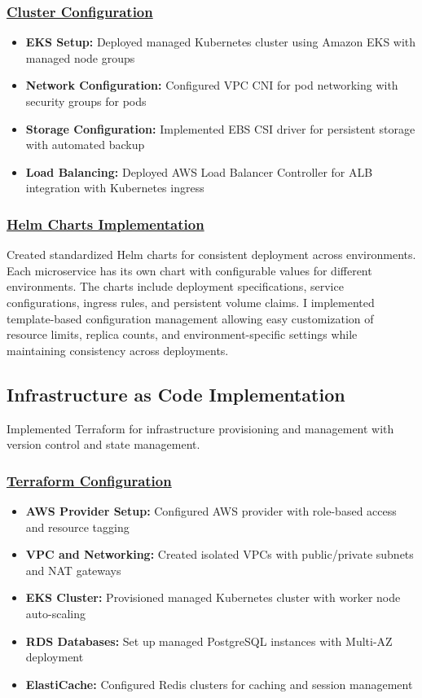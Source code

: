 \subsubsection*{\underline{Cluster Configuration}}
\begin{itemize}
    \item \textbf{EKS Setup:} Deployed managed Kubernetes cluster using Amazon EKS with managed node groups
    \item \textbf{Network Configuration:} Configured VPC CNI for pod networking with security groups for pods
    \item \textbf{Storage Configuration:} Implemented EBS CSI driver for persistent storage with automated backup
    \item \textbf{Load Balancing:} Deployed AWS Load Balancer Controller for ALB integration with Kubernetes ingress
\end{itemize}

\subsubsection*{\underline{Helm Charts Implementation}}
Created standardized Helm charts for consistent deployment across environments. Each microservice has its own chart with configurable values for different environments. The charts include deployment specifications, service configurations, ingress rules, and persistent volume claims. I implemented template-based configuration management allowing easy customization of resource limits, replica counts, and environment-specific settings while maintaining consistency across deployments.

\subsection{Infrastructure as Code Implementation}
Implemented Terraform for infrastructure provisioning and management with version control and state management.

\subsubsection*{\underline{Terraform Configuration}}
\begin{itemize}
    \item \textbf{AWS Provider Setup:} Configured AWS provider with role-based access and resource tagging
    \item \textbf{VPC and Networking:} Created isolated VPCs with public/private subnets and NAT gateways
    \item \textbf{EKS Cluster:} Provisioned managed Kubernetes cluster with worker node auto-scaling
    \item \textbf{RDS Databases:} Set up managed PostgreSQL instances with Multi-AZ deployment
    \item \textbf{ElastiCache:} Configured Redis clusters for caching and session management
\end{itemize}

